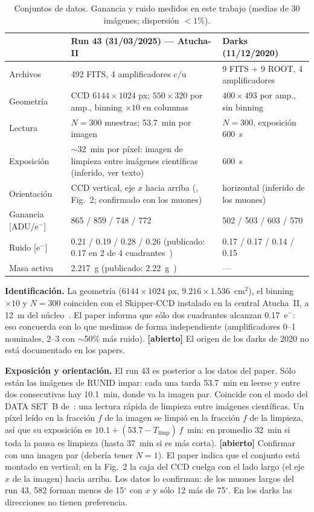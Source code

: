 \documentclass[10pt,a4paper]{article}
\newcommand{\eminus}{e$^-$}
\newcommand{\abierto}[1]{\textcolor{orange!80!black}{\textbf{[abierto]} #1}}
\begin{document}
\begin{table}[h]
\centering\small
\caption{Conjuntos de datos. Ganancia y ruido medidos en este trabajo (medias de 30 imágenes; dispersión $<1\%$).}
\label{tab:datos}
\begin{tabularx}{\textwidth}{@{}lXX@{}}
\toprule
 & \textbf{Run 43 (31/03/2025) --- Atucha-II} & \textbf{Darks (11/12/2020)} \\
\midrule
Archivos & 492 FITS, 4 amplificadores c/u & 9 FITS + 9 ROOT, 4 amplificadores \\
Geometría & CCD $6144\times1024$ px; $550\times320$ por amp., binning $\times10$ en columnas & $400\times493$ por amp., sin binning \\
Lectura & $N=300$ muestras; 53.7~min por imagen & $N=300$, exposición 600~s \\
Exposición & $\sim$32~min por píxel: imagen de limpieza entre imágenes científicas (inferido, ver texto) & 600~s \\
Orientación & CCD vertical, eje $x$ hacia arriba (\cite{depaoli2024}, Fig.~2; confirmado con los muones) & horizontal (inferido de los muones) \\
Ganancia [ADU/\eminus] & 865 / 859 / 748 / 772 & 502 / 503 / 603 / 570 \\
Ruido [\eminus] & 0.21 / 0.19 / 0.28 / 0.26 (publicado: 0.17 en 2 de 4 cuadrantes~\cite{depaoli2024}) & 0.17 / 0.17 / 0.14 / 0.15 \\
Masa activa & 2.217~g (publicado: 2.22~g~\cite{depaoli2024}) & --- \\
\bottomrule
\end{tabularx}
\end{table}

\textbf{Identificación.} La geometría ($6144\times1024$ px, $9.216\times1.536$~cm$^2$), el binning $\times10$
y $N=300$ coinciden con el Skipper-CCD instalado en la central Atucha~II, a 12~m del núcleo~\cite{depaoli2024}.
El paper informa que sólo dos cuadrantes alcanzan 0.17~\eminus: eso concuerda con lo que medimos de forma
independiente (amplificadores 0--1 nominales, 2--3 con $\sim$50\% más ruido). \abierto{El origen de los darks
de 2020 no está documentado en los papers.}

\textbf{Exposición y orientación.} El run 43 es posterior a los datos del paper. Sólo están las imágenes de
RUNID impar: cada una tarda 53.7~min en leerse y entre dos consecutivas hay 10.1~min, donde va la imagen par.
Coincide con el modo del DATA SET~B de~\cite{depaoli2024}: una lectura rápida de limpieza entre imágenes
científicas. Un píxel leído en la fracción $f$ de la imagen se limpió en la fracción $f$ de la limpieza, así que
su exposición es $10.1 + (53.7 - T_\mathrm{limp})\,f$~min: en promedio 32~min si toda la pausa es limpieza
(hasta 37~min si es más corta). \abierto{Confirmar con una imagen par (debería tener $N=1$).} El paper indica
que el conjunto está montado en vertical; en la Fig.~2 la caja del CCD cuelga con el lado largo (el eje $x$ de
la imagen) hacia arriba. Los datos lo confirman: de los muones largos del run 43, 582 forman menos de
15$^\circ$ con $x$ y sólo 12 más de 75$^\circ$. En los darks las direcciones no tienen preferencia.
\end{document}
